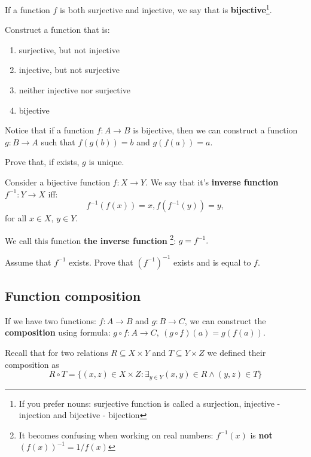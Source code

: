 \begin{definition}
If a function $f$ is both surjective and injective, we say that is \textbf{bijective}\footnote{If you prefer nouns: surjective function is called a surjection, injective - injection
and bijective - bijection}.
\end{definition}

\begin{exercise}
	Construct a function that is:
	\begin{enumerate}
		\item surjective, but not injective
		\item injective, but not surjective
		\item neither injective nor surjective
		\item bijective
	\end{enumerate}
\end{exercise}

\noindent Notice that if a function $f: A\to B$ is bijective, then we can construct a function $g:B\to A$
such that $f(g(b))=b$ and $g(f(a))=a$.

\begin{prob}
	Prove that, if exists, $g$ is unique.
\end{prob}

\begin{definition}
  Consider a bijective function $f:X\to Y$. We say that it's \textbf{inverse function} $f^{-1}:Y\to X$ iff:
  $$f^{-1}(f(x))=x, f(f^{-1}(y))=y,$$
  for all $x\in X,\, y\in Y$.
\end{definition}

\noindent We call this function \textbf{the inverse function}
\footnote{It becomes confusing when working on real numbers: $f^{-1}(x)$ is
\textbf{not} $(f(x))^{-1}=1/f(x)$}: $g=f^{-1}.$

\begin{prob}
	Assume that $f^{-1}$ exists. Prove that $(f^{-1})^{-1}$ exists and is equal to $f$.
\end{prob}

\subsection{Function composition}
If we have two functions: $f:A\to B$ and $g: B\to C$, we can construct the \textbf{composition} using formula:
$g\circ f: A\to C,~(g\circ f)(a) = g(f(a)).$

\begin{exercise}
  Recall that for two relations $R\subseteq X\times Y$ and $T\subseteq Y\times Z$ we defined their composition as $$R\circ T=\{(x,z)\in X\times Z : \exists_{y\in Y} (x,y)\in R \wedge (y,z)\in T\}$$
\end{exercise}

